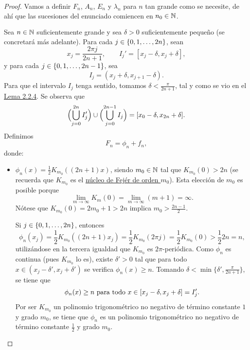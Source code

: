 \documentclass[a4paper, 12pt, oneside]{book}
\begin{document}
\begin{proof}
    Vamos a definir $F_n$, $A_n$, $E_n$ y $\lambda_n$ para $n$ tan grande como se necesite, de ahí que las sucesiones del enunciado comiencen en $n_0\in\mathbb N$.
    
    Sea $n \in \mathbb N$ suficientemente grande y sea $\delta > 0$ suficientemente pequeño (se concretará más adelante). Para cada $j \in \{0,1,\mathellipsis,2n\}$, sean
    \[x_j = \frac{2\pi j}{2n+1}, \qquad I_j' = [x_j-\delta,x_j+\delta],\]
    y para cada $j \in \{0,1,\mathellipsis,2n-1\}$, sea
    \[I_j = (x_j+\delta, x_{j+1}-\delta).\]
    Para que el intervalo $I_j$ tenga sentido, tomamos $\delta < \frac{\pi}{2n+1}$, tal y como se vio en el \hyperref[2.2.4]{\color{blue}Lema 2.2.4}. Se observa que
    \[\Bigl(\bigcup_{j=0}^{2n}I_j'\Bigr) \cup\Bigl(\bigcup_{j=0}^{2n-1}I_j\Bigr) = [x_0-\delta,x_{2n}+\delta].\]
    Definimos
    \[F_n = \phi_n+f_n,\]
    donde:
    \begin{itemize}
        \item $\phi_n(x) = \frac{1}{2}K_{m_0}((2n+1)x)$, siendo $m_0 \in \mathbb N$ tal que $K_{m_0}(0) > 2n$ (se recuerda que $K_{m_0}$ es el \hyperref[1.2.5]{\color{blue}núcleo de Fejér de orden $m_0$}). Esta elección de $m_0$ es posible porque \[\lim_{m \to \infty} K_m(0) = \lim_{m \to \infty} (m+1) = \infty.\]
        Nótese que $K_{m_0}(0)=2m_0+1 > 2n$ implica $m_0 > \frac{2n-1}{2}$. 
        
        Si $j \in \{0,1,\mathellipsis,2n\}$, entonces
        \[\phi_n(x_j) = \frac{1}{2}K_{m_0}((2n+1)x_j) = \frac{1}{2}K_{m_0}(2\pi j) = \frac{1}{2}K_{m_0}(0) > \frac{1}{2}2n = n,\] 
        utilizándose en la tercera igualdad que $K_{m_0}$ es $2\pi$-periódica. Como $\phi_n$ es continua (pues $K_{m_0}$ lo es), existe $\delta' > 0$ tal que para todo $x \in (x_j-\delta',x_j+\delta')$ se verifica $\phi_n(x) \geq n$. Tomando $\delta < \min\{\delta',\frac{\pi}{2n+1}\}$, se tiene que
        \begin{equation}\label{2.2.10}
            \phi_n(x) \geq n \textup{ para todo } x \in [x_j-\delta,x_j+\delta] = I_j'.
        \end{equation}
        Por ser $K_{m_0}$ un polinomio trigonométrico no negativo de término constante $1$ y grado $m_0$, se tiene que $\phi_n$ es un polinomio trigonométrico no negativo de término constante $\frac{1}{2}$ y grado $m_0$. 
        

\end{itemize}
\end{proof}
\end{document}
